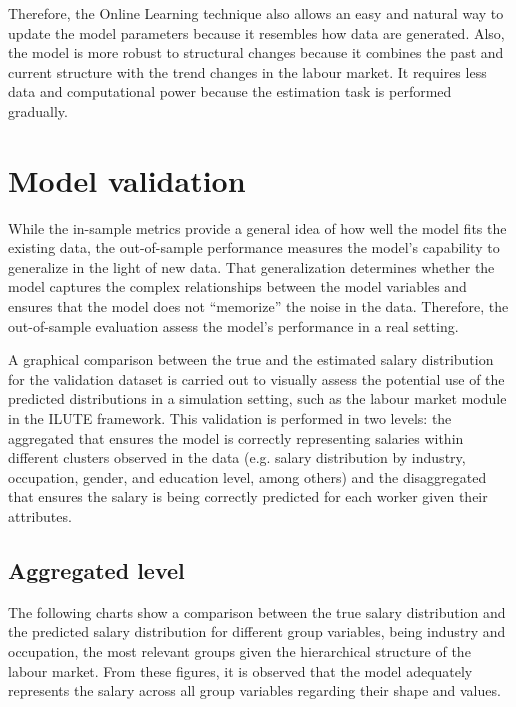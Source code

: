 Therefore, the Online Learning technique also allows an easy and natural way to update the model parameters because it resembles how data are generated. Also, the model is more robust to structural changes because it combines the past and current structure with the trend changes in the labour market. It requires less data and computational power because the estimation task is performed gradually. 
   
\section{Model validation}\label{section:model_validation}

While the in-sample metrics provide a general idea of how well the model fits the existing data, the out-of-sample performance measures the model's capability to generalize in the light of new data. That generalization determines whether the model captures the complex relationships between the model variables and ensures that the model does not “memorize” the noise in the data. Therefore, the out-of-sample evaluation assess the model's performance in a real setting. 

A graphical comparison between the true and the estimated salary distribution for the validation dataset is carried out to visually assess the potential use of the predicted distributions in a simulation setting, such as the labour market module in the ILUTE framework. This validation is performed in two levels: the aggregated that ensures the model is correctly representing salaries within different clusters observed in the data (e.g. salary distribution by industry, occupation, gender, and education level, among others) and the disaggregated that ensures the salary is being correctly predicted for each worker given their attributes.

\subsection{Aggregated level} 

The following charts show a comparison between the true salary distribution and the predicted salary distribution for different group variables, being industry and occupation, the most relevant groups given the hierarchical structure of the labour market. From these figures, it is observed that the model adequately represents the salary across all group variables regarding their shape and values.


